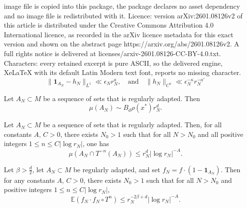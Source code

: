 \documentclass[10pt,a4paper]{amsart}
\def\one{{\mathbf{1}}}
\newcommand{\E}{\mathbb{E}}
\begin{document}
image file is copied into this package, the package declares no asset dependency and no image file is redistributed with it. Licence: version arXiv:2601.08126v2 of this article is distributed under the Creative Commons Attribution 4.0 International licence, as recorded in the arXiv licence metadata for this exact version and shown on the abstract page https://arxiv.org/abs/2601.08126v2. A full rights notice is delivered at licenses/arxiv-2601.08126-CC-BY-4.0.txt. Characters: every retained excerpt is pure ASCII, so the delivered engine, XeLaTeX with its default Latin Modern text font, reports no missing character.
\begin{equation}\label{regasm2}
\|\one_{A_N}-h_N\|_{L^1} \ll \epsilon_N r_N^a, \quad \text{and} \quad \|h_N\|_{C^{\kappa}} \ll \epsilon_N^{-\kappa} r_N^{-a'}
\end{equation}

\begin{lemma}\label{regadaptmeasure}
Let $A_N\subset M$ be a sequence of sets that is regularly adapted. Then
$$
\mu(A_N)\sim B_d\rho(x^*)r_N^d.
$$
\end{lemma}

\begin{lemma}\label{slowrecanlem}
Let $A_N\subset M$ be a sequence of sets that is regularly adapted. Then, for all constants $A,\,C>0$, there exists $N_0>1$ such that for all $N>N_0$ and all positive integers $1\le n\le C|\log r_N|$, one has
\begin{equation*}
\mu \left(A_N \cap T^{-n}(A_N) \right) \leq r_N^d |\log r_N|^{-A}.
\end{equation*}
\end{lemma}

\begin{lemma}\label{truncvarlem}
Let $\beta>\frac{d}{2}$, let $A_N \subset M$ be regularly adapted, and set $f_N=f \cdot \left(1-\one_{A_N}\right).$ Then for any constants $A,\,C>0$, there exists $N_0>1$ such that for all $N>N_0$ and positive integers $1\leq n\leq C |\log r_N|$,
\begin{equation}\label{truncvarlemconc}
\E\left(f_N \cdot f_N\circ T^n\right) \leq r_N^{- 2\beta + d} |\log r_N|^{-A}.
\end{equation}
\end{lemma}
\end{document}
